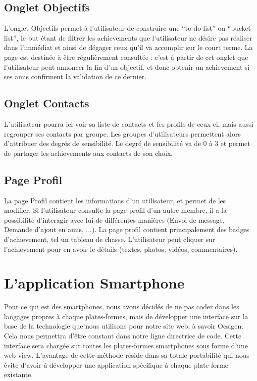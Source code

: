 \documentclass{life-fr}
\begin{document}
\subsection{Onglet Objectifs}

L'onglet Objectifs permet à l'utilisateur de construire une “to-do list” ou “bucket-list”, le but étant de filtrer les achievements que l'utilisateur ne désire pas réaliser dans l'immédiat et ainsi de dégager ceux qu'il va accomplir sur le court terme. La page est destinée à être régulièrement consultée : c'est à partir de cet onglet que l'utilisateur peut annoncer la fin d'un objectif, et donc obtenir un achievement si ses amis confirment la validation de ce dernier.

\subsection{Onglet Contacts}

L'utilisateur pourra ici voir sa liste de contacts et les profils de ceux-ci, mais aussi regrouper ses contacts par groupe. Les groupes d'utilisateurs permettent alors d'attribuer des degrés de sensibilité.
Le degré de sensibilité va de 0 à 3 et permet de partager les achievements aux contacts de son choix.

\subsection{Page Profil}
La page Profil contient les informations d'un utilisateur, et permet de les modifier. Si l'utilisateur consulte la page profil d'un autre membre, il a la possibilité d'interagir avec lui de différentes manières (Envoi de message, Demande d'ajout en amis, ...).
La page profil contient principalement des badges d'achievement, tel un tableau de chasse. L'utilisateur peut cliquer sur l'achievement pour en avoir le détails (textes, photos, vidéos, commentaires).

\section{L'application Smartphone}
Pour ce qui est des smartphones, nous avons décidés de ne pas coder dans les langages propres à chaque plates-formes, mais de développer une interface sur la base de la technologie que nous utilisons pour notre site web, à savoir Ocsigen. Cela nous permettra d'être constant dans notre ligne directrice de code. Cette interface sera chargée sur toutes les plates-formes smartphones sous forme d'une web-view. L'avantage de cette méthode réside dans sa totale portabilité qui nous évite d'avoir à développer une application spécifique à chaque plate-forme existante.
\end{document}
